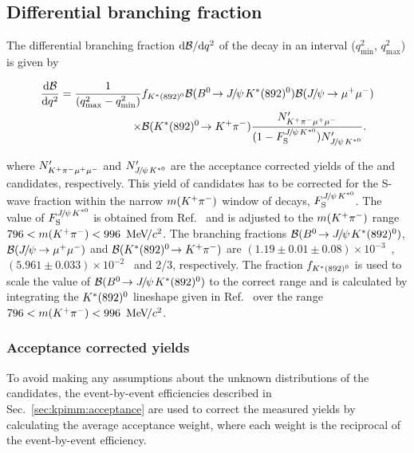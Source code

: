 \subsection{Differential branching fraction}
\label{sec:kpimm:bf}
 
The differential branching fraction $\mathrm{d}{\mathcal{B}}/\mathrm{d}{q^2}$ of the decay \BdToKpimm in an interval ($q^{2}_{\text{min}}$, $q^{2}_{\text{max}}$) is given by

\begin{equation}
\begin{split}
\frac{\deriv\BF}{\deriv\qsq} = \frac{1}{(q^{2}_{\text{max}} - q^{2}_{\text{min}}) }&f_{\KstP}\BF(\BdToJPsiKstP)\BF(\decay{\jpsi}{\mumu}) \\
\times&\BF(\decay{\KstP}{\Kp\pim})\frac{N'_{\kpimm}}{(1-F_{\rm S}^{\jpsi\Kstarz})N'_{\jpsi\Kstarz}}.
\end{split}
\label{eqn:dbfdq2}
\end{equation}
 
\noindent where $N'_{{{K}^+}{{\pi}^-}{\mu^+}{\mu^-}}$ and $N'_{{{J\mskip -3mu/\mskip -2mu\psi\mskip 2mu}}{{K}^{*0}}}$ are the acceptance corrected yields of the \BdToKpimm and \BdToJPsiKst candidates, respectively. This yield of \BdToJPsiKst candidates has to be corrected for the S-wave fraction within the narrow $m({{K}^+}{{\pi}^-})$ window of \BdToJPsiKst decays, $F_{\rm S}^{{{J\mskip -3mu/\mskip -2mu\psi\mskip 2mu}}{{K}^{*0}}}$. The value of $F_{\rm S}^{{{J\mskip -3mu/\mskip -2mu\psi\mskip 2mu}}{{K}^{*0}}}$ is obtained from Ref.~\cite{LHCb-JpsiKstar} and is adjusted to the $m({{K}^+}{{\pi}^-})$ range $796<m({{K}^+}{{\pi}^-})<996~{\mathrm{\,Me\kern -0.1em V\!/}c^2}$. The branching fractions ${\mathcal{B}}({{B}^0}\!\rightarrow {\ensuremath{{J\mskip -3mu/\mskip -2mu\psi\mskip 2mu}}}{\ensuremath{K}}^{*}(892)^{0})$, ${\mathcal{B}}({{J\mskip -3mu/\mskip -2mu\psi\mskip 2mu}}\!\rightarrow {\ensuremath{\mu^+\mu^-}})$ and ${\mathcal{B}}({K}^{*}(892)^{0}\!\rightarrow {\ensuremath{{K}^+}}{\ensuremath{{\pi}^-}})$ are $(1.19\pm0.01\pm0.08)\times10^{-3}$~\cite{belle-z-paper}, $(5.961 \pm 0.033) \times 10^{-2}$~\cite{pdg} and 2/3, respectively. The fraction $f_{{K}^{*}(892)^{0}}$ is used to scale the value of ${\mathcal{B}}({{B}^0}\!\rightarrow {\ensuremath{{J\mskip -3mu/\mskip -2mu\psi\mskip 2mu}}}{\ensuremath{K}}^{*}(892)^{0})$ to the correct \mkpi range and is calculated by integrating the ${K}^{*}(892)^{0}$ lineshape given in Ref.~\cite{belle-z-paper} over the range $796<m({{K}^+}{{\pi}^-})<996~{\mathrm{\,Me\kern -0.1em V\!/}c^2}$.
 
\subsubsection{Acceptance corrected yields}
 
To avoid making any assumptions about the unknown distributions of the \BdToKpimm candidates, the event-by-event efficiencies described in Sec.~\ref{sec:kpimm:acceptance} are used to correct the measured yields by calculating the average acceptance weight, where each weight is the reciprocal of the event-by-event efficiency.
 
